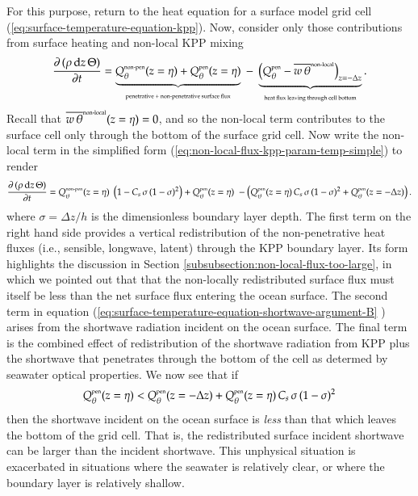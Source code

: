 For this purpose, return to the heat equation for a surface model grid
cell (\ref{eq:surface-temperature-equation-kpp}).  Now, consider only
those contributions from surface heating and non-local KPP mixing
\begin{equation}
 \frac{\partial \, (\rho \, \mathrm{d}z \, \Theta)}{\partial t} 
 =  \underbrace{
  Q_{\theta}^{\mbox{\tiny non-pen}}(z=\eta) +  Q_{\theta}^{\mbox{\tiny pen}}(z=\eta)
  }_{\mbox{\tiny penetrative + non-penetrative surface flux}} 
   \; - \; \underbrace{
    \left( Q_{\theta}^{\mbox{\tiny pen}} -  \overline{w \, \theta}^{\mbox{\tiny non-local}}\right)_{z=-\Delta z}
    }_{\mbox{\tiny heat flux leaving through cell bottom}}. 
 \label{eq:surface-temperature-equation-shortwave-argument-A} 
\end{equation}
Recall that $\overline{w \, \theta}^{\mbox{\tiny non-local}}(z=\eta) =
0$, and so the non-local term contributes to the surface cell only
through the bottom of the surface grid cell.  Now write the non-local
term in the simplified form
(\ref{eq:non-local-flux-kpp-param-temp-simple}) to render
\begin{equation}
 \frac{\partial \, (\rho \, \mathrm{d}z \, \Theta)}{\partial t} 
 =     Q_{\theta}^{\mbox{\tiny non-pen}}(z=\eta) \;     \left( 1 - C_{s} \, \sigma \, (1-\sigma)^{2} \right) 
    +  Q_{\theta}^{\mbox{\tiny pen}}(z=\eta) \;     
    - \left( Q_{\theta}^{\mbox{\tiny pen}}(z=\eta) \, C_{s} \, \sigma \, (1-\sigma)^{2} 
    + Q_{\theta}^{\mbox{\tiny pen}}(z=-\Delta z)  \right). 
 \label{eq:surface-temperature-equation-shortwave-argument-B} 
\end{equation}
where $\sigma = \Delta z / h$ is the dimensionless boundary layer
depth.  The first term on the right hand side provides a vertical
redistribution of the non-penetrative heat fluxes (i.e., sensible,
longwave, latent) through the KPP boundary layer.  Its form highlights
the discussion in Section
\ref{subsubsection:non-local-flux-too-large}, in which we pointed out
that that the non-locally redistributed surface flux must itself be
less than the net surface flux entering the ocean surface.  The second
term in equation
(\ref{eq:surface-temperature-equation-shortwave-argument-B} ) arises
from the shortwave radiation incident on the ocean surface.  The final
term is the combined effect of redistribution of the shortwave
radiation from KPP plus the shortwave that penetrates through the
bottom of the cell as determed by seawater optical properties.  We now
see that if
\begin{equation}
 Q_{\theta}^{\mbox{\tiny pen}}(z=\eta)  <    Q_{\theta}^{\mbox{\tiny pen}}(z=-\Delta z)  + 
 Q_{\theta}^{\mbox{\tiny pen}}(z=\eta)   \, C_{s} \, \sigma \, (1-\sigma)^{2} 
\label{eq:shortwave-pathology-A}
\end{equation}
then the shortwave incident on the ocean surface is {\it less} than
that which leaves the bottom of the grid cell. That is, the
redistributed surface incident shortwave can be larger than the
incident shortwave.  This unphysical situation is exacerbated in
situations where the seawater is relatively clear, or where the
boundary layer is relatively shallow.


